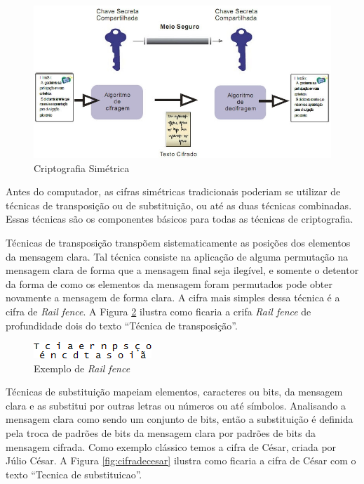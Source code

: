 \begin{figure}[H]
    \centering
    \caption{Criptografia Simétrica}
    \label{fig:cripsimerica}
    \includegraphics[width=.8\linewidth]{Figuras/CripSimetrica.jpg}
\end{figure}

Antes do computador, as cifras simétricas tradicionais poderiam se utilizar de técnicas de transposição ou de substituição, ou até as duas técnicas combinadas. Essas técnicas são os componentes básicos para todas as técnicas de criptografia.

Técnicas de transposição transpõem sistematicamente as posições dos elementos da mensagem clara. Tal técnica consiste na aplicação de alguma permutação na mensagem clara de forma que a mensagem final seja ilegível, e somente o detentor da forma de como os elementos da mensagem foram permutados pode obter novamente a mensagem de forma clara. A cifra mais simples dessa técnica é a cifra de \textit{Rail fence}. A Figura \ref{fig:railfence} ilustra como ficaria a crifa \textit{Rail fence} de profundidade dois do texto “Técnica de transposição”.

\begin{figure}[H]
    \centering
    \caption{Exemplo de \textit{Rail fence}}
    \label{fig:railfence}
    \includegraphics{Figuras/RailFence.png}
\end{figure}

Técnicas de substituição mapeiam elementos, caracteres ou bits, da mensagem clara e as substitui por outras letras ou números ou até símbolos. Analisando a mensagem clara como sendo um conjunto de bits, então a substituição é definida pela troca de padrões de bits da mensagem clara por padrões de bits da mensagem cifrada. Como exemplo clássico temos a cifra de César, criada por Júlio César. A Figura \ref{fig:cifradecesar} ilustra como ficaria a cifra de César com o texto “Tecnica de substituicao”.

